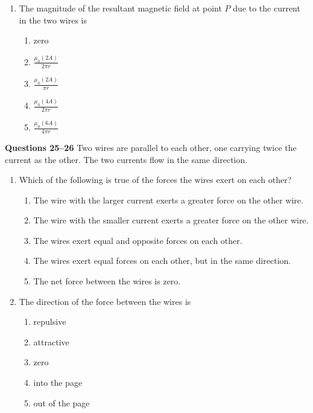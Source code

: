 \documentclass{../../../oss-apphys}
\begin{document}
\begin{multicols}{2}
\begin{enumerate}[leftmargin=18pt,resume]
  \item The magnitude of the resultant magnetic field at point $P$ due to the
    current in the two wires is
    \begin{enumerate}[noitemsep,topsep=0pt,leftmargin=18pt,label=(\Alph*)]
    \item zero
    \item $\displaystyle\frac{\mu_0(2A)}{2\pi r}$
    \item $\displaystyle\frac{\mu_0(2A)}{\pi r}$
    \item $\displaystyle\frac{\mu_0(4A)}{2\pi r}$
    \item $\displaystyle\frac{\mu_0(6A)}{4\pi r}$
    \end{enumerate}
  \end{enumerate}
  \columnbreak
  \textbf{Questions 25--26}
  Two wires are parallel to each other, one carrying twice the current as the
  other. The two currents flow in the same direction.

  \begin{enumerate}[leftmargin=18pt,resume]
  \item Which of the following is true of the forces the wires exert on each
    other?
    \begin{enumerate}[noitemsep,topsep=0pt,leftmargin=18pt,label=(\Alph*)]
    \item The wire with the larger current exerts a greater force on the other
      wire.
    \item The wire with the smaller current exerts a greater force on the other
      wire.
    \item The wires exert equal and opposite forces on each other.
    \item The wires exert equal forces on each other, but in the same direction.
    \item The net force between the wires is zero.
    \end{enumerate}

  \item The direction of the force between the wires is
    \begin{enumerate}[noitemsep,topsep=0pt,leftmargin=18pt,label=(\Alph*)]
    \item repulsive
    \item attractive
    \item zero
    \item into the page
    \item out of the page
    \end{enumerate}


\end{enumerate}
\end{multicols}
\end{document}
